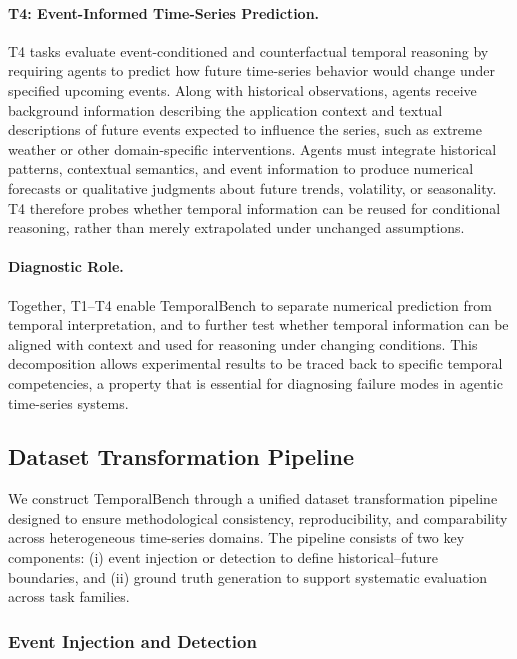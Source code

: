 \paragraph{T4: Event-Informed Time-Series Prediction.}
T4 tasks evaluate event-conditioned and counterfactual temporal reasoning by requiring agents to predict how future time-series behavior would change under specified upcoming events.
Along with historical observations, agents receive background information describing the application context and textual descriptions of future events expected to influence the series, such as extreme weather or other domain-specific interventions.
Agents must integrate historical patterns, contextual semantics, and event information to produce numerical forecasts or qualitative judgments about future trends, volatility, or seasonality.
T4 therefore probes whether temporal information can be reused for conditional reasoning, rather than merely extrapolated under unchanged assumptions.

\paragraph{Diagnostic Role.}
Together, T1–T4 enable TemporalBench to separate numerical prediction from temporal interpretation, and to further test whether temporal information can be aligned with context and used for reasoning under changing conditions.
This decomposition allows experimental results to be traced back to specific temporal competencies, a property that is essential for diagnosing failure modes in agentic time-series systems.




\subsection{Dataset Transformation Pipeline}

We construct TemporalBench through a unified dataset transformation pipeline designed to ensure methodological consistency, reproducibility, and comparability across heterogeneous time-series domains. The pipeline consists of two key components: (i) event injection or detection to define historical–future boundaries, and (ii) ground truth generation to support systematic evaluation across task families.

\subsubsection{Event Injection and Detection}

